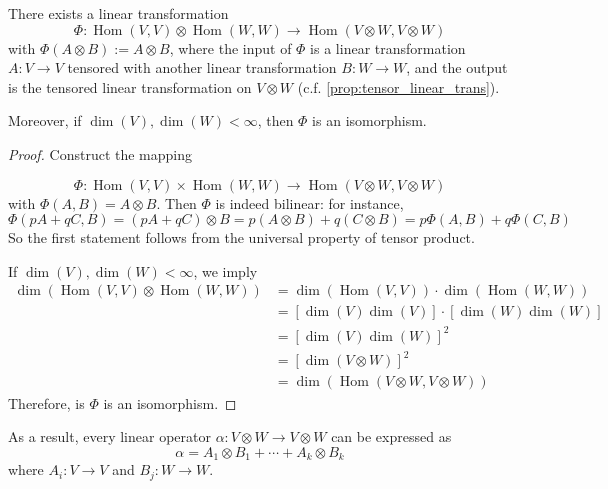 \begin{corollary}
There exists a linear transformation
\[
\Phi : \operatorname{Hom}\left( {V,V}\right)  \otimes  \operatorname{Hom}\left( {W,W}\right)  \rightarrow  \operatorname{Hom}\left( {V \otimes  W,V \otimes  W}\right)
\]
with \(\Phi(A \otimes  B) :=  A \otimes  B\), where the input of \(\Phi\) is a linear transformation $A:V \to V$ tensored with another linear transformation $B: W \to W$, and the output is the tensored linear transformation on $V \otimes W$ (c.f. \autoref{prop:tensor_linear_trans}).

Moreover, if $\dim(V), \dim(W) < \infty$, then $\Phi$ is an isomorphism.
\end{corollary} 

\begin{proof}
Construct the mapping

\[
\Phi  : \operatorname{Hom}\left( {V,V}\right)  \times  \operatorname{Hom}\left( {W,W}\right)  \rightarrow  \operatorname{Hom}\left( {V \otimes  W,V \otimes  W}\right)
\]
with \(\Phi \left( {A,B}\right)  = A \otimes  B
\). Then \(\Phi\) is indeed bilinear: for instance,
\[
\Phi \left( {{pA} + {qC},B}\right)  = \left( {{pA} + {qC}}\right)  \otimes  B
= p\left( {A \otimes  B}\right)  + q\left( {C \otimes  B}\right)
= {p\Phi }\left( {A,B}\right)  + {q\Phi }\left( {C,B}\right)
\]
So the first statement follows from the universal property of tensor product.

If \(\dim \left( V\right) ,\dim \left( W\right)  < \infty\), we imply
\begin{align*}
\dim(\operatorname{Hom}\left( {V,V}\right)  \otimes  \operatorname{Hom}\left( {W,W}\right)) &= \dim \left( {\operatorname{Hom}\left( {V,V}\right) }\right) \cdot \dim \left( {\operatorname{Hom}\left( {W,W}\right) }\right)
\\
&= \left\lbrack  {\dim \left( V\right) \dim \left( V\right) }\right\rbrack   \cdot  \left\lbrack  {\dim \left( W\right) \dim \left( W\right) }\right\rbrack   \\
&= {\left\lbrack  \dim \left( V\right) \dim \left( W\right) \right\rbrack  }^2
\\
&= {\left\lbrack  \dim \left( V \otimes  W\right) \right\rbrack  }^2
\\
&= \dim \left( {\operatorname{Hom}\left( {V \otimes  W,V \otimes  W}\right) }\right)
\end{align*}
Therefore, is \(\Phi\) is an isomorphism.    
\end{proof}

As a result, every linear operator \(\alpha  : V \otimes  W \rightarrow V \otimes  W\) can be expressed as
\[
\alpha  = {A}_1 \otimes  {B}_1 + \cdots  + {A}_{k} \otimes  {B}_{k}
\]
where \({A}_{i} : V \rightarrow  V\) and \({B}_{j} : W \rightarrow  W\).